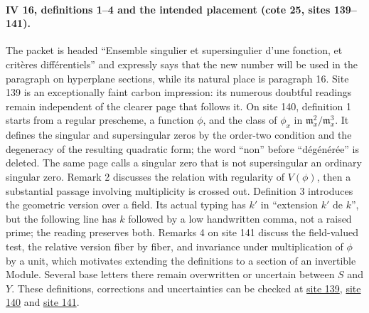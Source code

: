 \documentclass[10pt,a4paper]{article}
\newcommand{\CurrentScanLabel}{}
\begin{document}
\clearpage\gdef\CurrentScanLabel{Guide}
\par{}
\paragraph{IV 16, definitions 1--4 and the intended placement (cote 25, sites 139--141).}
The packet is headed ``Ensemble singulier et supersingulier d'une fonction, et critères différentiels'' and expressly says that the new number will be used in the paragraph on hyperplane sections, while its natural place is paragraph 16. Site 139 is an exceptionally faint carbon impression: its numerous doubtful readings remain independent of the clearer page that follows it. On site 140, definition 1 starts from a regular prescheme, a function $\phi$, and the class of $\phi_x$ in $\mathfrak m_x^2/\mathfrak m_x^3$. It defines the singular and supersingular zeros by the order-two condition and the degeneracy of the resulting quadratic form; the word ``non'' before ``dégénérée'' is deleted. The same page calls a singular zero that is not supersingular an ordinary singular zero. Remark 2 discusses the relation with regularity of $V(\phi)$, then a substantial passage involving multiplicity is crossed out. Definition 3 introduces the geometric version over a field. Its actual typing has $k'$ in ``extension $k'$ de $k$'', but the following line has $k$ followed by a low handwritten comma, not a raised prime; the reading preserves both. Remarks 4 on site 141 discuss the field-valued test, the relative version fiber by fiber, and invariance under multiplication of $\phi$ by a unit, which motivates extending the definitions to a section of an invertible Module. Several base letters there remain overwritten or uncertain between $S$ and $Y$. These definitions, corrections and uncertainties can be checked at \href{https://grothendieck.umontpellier.fr/web/viewer.html?file=../25.pdf#page=140}{site 139}, \href{https://grothendieck.umontpellier.fr/web/viewer.html?file=../25.pdf#page=141}{site 140} and \href{https://grothendieck.umontpellier.fr/web/viewer.html?file=../25.pdf#page=142}{site 141}.
\end{document}
